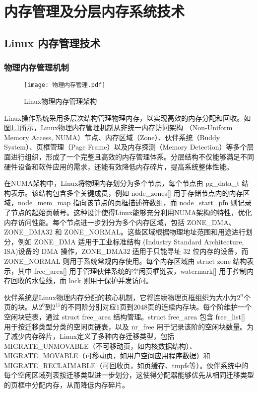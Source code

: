 \chapter{内存管理及分层内存系统技术}

\section{Linux 内存管理技术}

\subsection{物理内存管理机制}

\begin{figure}[htb]
    \centering
    \texttt{[image: 物理内存管理.pdf]}
    \caption{Linux物理内存管理架构}
    \label{物理内存管理}
\end{figure}

Linux操作系统采用多层次结构管理物理内存，以实现高效的内存分配和回收。如图\ref{物理内存管理}所示，Linux物理内存管理机制从非统一内存访问架构 （Non-Uniform Memory Access, NUMA）节点、内存区域（Zone）、伙伴系统（Buddy System）、页框管理（Page Frame）以及内存探测（Memory Detection）等多个层面进行组织，形成了一个完整且高效的内存管理体系。分层结构不仅能够满足不同硬件设备和软件应用的需求，还能有效降低内存碎片，提高系统整体性能。

在NUMA架构中，Linux将物理内存划分为多个节点，每个节点由 pg\_data\_t 结构表示。该结构包含多个关键成员，例如 node\_zones[] 用于存储节点内的内存区域，node\_mem\_map 指向该节点的页框描述符数组，而 node\_start\_pfn 则记录了节点的起始页帧号。这种设计使得Linux能够充分利用NUMA架构的特性，优化内存访问性能。每个节点进一步划分为多个内存区域，包括 ZONE\_DMA、ZONE\_DMA32 和 ZONE\_NORMAL。这些区域根据物理地址范围和用途进行划分，例如 ZONE\_DMA 适用于工业标准结构 (Industry Standard Architecture, ISA)设备的 DMA 操作，ZONE\_DMA32 适用于只能寻址 32 位内存的设备，而 ZONE\_NORMAL 则用于系统常规内存使用。每个内存区域由 struct zone 结构表示，其中 free\_area[] 用于管理伙伴系统的空闲页框链表，watermark[] 用于控制内存回收的水位线，而 lock 则用于保护并发访问。

伙伴系统是Linux物理内存分配的核心机制，它将连续物理页框组织为大小为\(2^n\)个页的块。从\(2^0\)到\(2^{11}\)的不同阶分别对应1页到2048页的连续内存块。每个阶维护一个空闲块链表，通过 struct free\_area 结构管理。struct free\_area 包含 free\_list[] 用于按迁移类型分类的空闲页链表，以及 nr\_free 用于记录该阶的空闲块数量。为了减少内存碎片，Linux定义了多种内存迁移类型，包括 MIGRATE\_UNMOVABLE（不可移动页，如内核数据结构）、MIGRATE\_MOVABLE（可移动页，如用户空间应用程序数据）和 MIGRATE\_RECLAIMABLE（可回收页，如页缓存、tmpfs等）。伙伴系统中的每个空闲区域列表按迁移类型进一步划分，这使得分配器能够优先从相同迁移类型的页框中分配内存，从而降低内存碎片。

